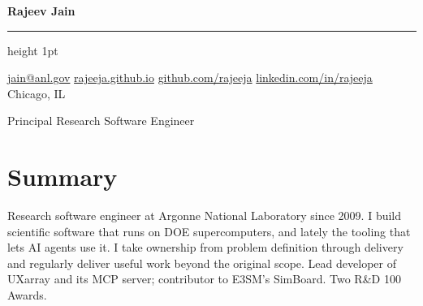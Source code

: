 \documentclass[10pt,letterpaper]{article}
\begin{document}
\sloppy

{\fontsize{22}{24}\selectfont\bfseries\color{accent}Rajeev Jain}\par
\vspace{5pt}
{\color{rulegray}\hrule height 1pt}
\vspace{7pt}
{\small\color{mutedgray}\href{mailto:jain@anl.gov}{jain@anl.gov} \quad\textbar\quad \href{https://rajeeja.github.io}{rajeeja.github.io} \quad\textbar\quad \href{https://github.com/rajeeja}{github.com/rajeeja} \quad\textbar\quad \href{https://linkedin.com/in/rajeeja}{linkedin.com/in/rajeeja} \quad\textbar\quad Chicago, IL\par}
\vspace{8pt}

{\large\color{mutedgray} Principal Research Software Engineer}\par
\vspace{6pt}

\section{Summary}
Research software engineer at Argonne National Laboratory since 2009. I build scientific software that runs on DOE supercomputers, and lately the tooling that lets AI agents use it. I take ownership from problem definition through delivery and regularly deliver useful work beyond the original scope. Lead developer of UXarray and its MCP server; contributor to E3SM's SimBoard. Two R\&D 100 Awards.
\end{document}
